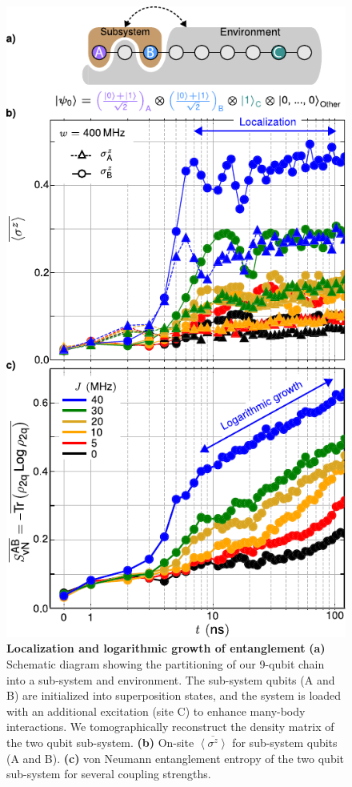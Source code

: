 \begin{figure}[tb!]
    \centering
        \includegraphics[width=250 pt, keepaspectratio]{./PDF/f5_190716_156p.pdf}
        \caption{\small
        \textbf{Localization and logarithmic growth of entanglement}
        \textbf{(a)} Schematic diagram showing the partitioning of our 9-qubit chain into a sub-system and environment.
        The sub-system qubits (A and B) are initialized into superposition states,
        and the system is loaded with an additional excitation (site C) to enhance many-body interactions.
        We tomographically reconstruct the  density matrix of the two qubit sub-system.
        \textbf{(b)} On-site $\overline{\left< \sigma^z \right>}$ for sub-system qubits (A and B).
        \textbf{(c)} von Neumann entanglement entropy of the two qubit sub-system for several coupling strengths. %
        }
        \label{fig_4}
\end{figure}

